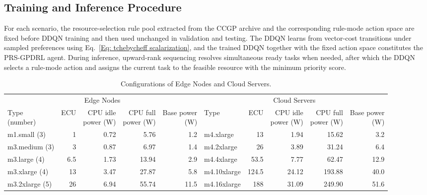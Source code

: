 \documentclass[10pt,journal]{IEEEtran}
\begin{document}
\subsection{Training and Inference Procedure}
\label{Sec: training inference}

For each scenario, the resource-selection rule pool extracted from the CCGP archive and the corresponding rule-mode action space are fixed before DDQN training and then used unchanged in validation and testing. The DDQN learns from vector-cost transitions under sampled preferences using Eq.~\eqref{Eq: tchebycheff scalarization}, and the trained DDQN together with the fixed action space constitutes the PRS-GPDRL agent. During inference, upward-rank sequencing resolves simultaneous ready tasks when needed, after which the DDQN selects a rule-mode action and assigns the current task to the feasible resource with the minimum priority score.

\begin{table}[!t]
\caption{Configurations of Edge Nodes and Cloud Servers.}
\label{Table: resource configurations}
\centering
\begin{tabular}{@{}lrrrrlrrrr@{}}
\toprule
\multicolumn{5}{c}{Edge Nodes} & \multicolumn{5}{c}{Cloud Servers} \\
\cmidrule(lr){1-5}\cmidrule(lr){6-10}
\makecell{Type\\(number)} & ECU &
\makecell{CPU idle\\power (W)} &
\makecell{CPU full\\power (W)} &
\makecell{Base power\\(W)} &
Type & ECU &
\makecell{CPU idle\\power (W)} &
\makecell{CPU full\\power (W)} &
\makecell{Base power\\(W)} \\
\midrule
m1.small (3) & 1 & 0.72 & 5.76 & 1.2 &
m4.xlarge & 13 & 1.94 & 15.62 & 3.2 \\
m3.medium (3) & 3 & 0.87 & 6.97 & 1.4 &
m4.2xlarge & 26 & 3.89 & 31.24 & 6.4 \\
m3.large (4) & 6.5 & 1.73 & 13.94 & 2.9 &
m4.4xlarge & 53.5 & 7.77 & 62.47 & 12.9 \\
m3.xlarge (4) & 13 & 3.47 & 27.87 & 5.8 &
m4.10xlarge & 124.5 & 24.12 & 193.88 & 40.0 \\
m3.2xlarge (5) & 26 & 6.94 & 55.74 & 11.5 &
m4.16xlarge & 188 & 31.09 & 249.90 & 51.6 \\
\bottomrule
\end{tabular}
\vspace{-1em}
\end{table}
\end{document}
